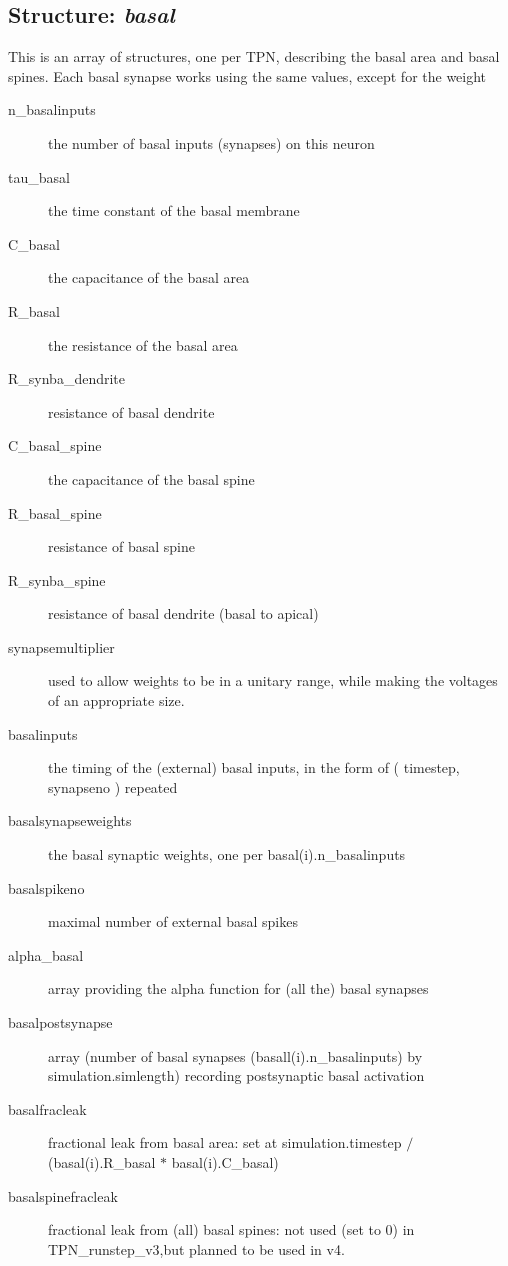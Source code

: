 \documentclass[11pt, oneside]{article}   	%
\begin{document}
\subsection{Structure: {\it basal}}
This is an array of structures, one per TPN, describing the basal area and basal spines. Each basal synapse works using the same values, except for the weight
\begin{description}
\item[n\_basalinputs] the number of basal inputs (synapses) on this neuron
\item[tau\_basal] the time constant of the basal membrane
\item[C\_basal] the capacitance of the basal area
\item[R\_basal] the resistance of the basal area
\item[R\_synba\_dendrite] resistance of basal dendrite
\item[C\_basal\_spine] the capacitance of the basal spine
\item[R\_basal\_spine] resistance of basal spine
\item[R\_synba\_spine] resistance of basal dendrite (basal to apical)
\item[synapsemultiplier] used to allow weights to be in a unitary range, while making the voltages of an appropriate size.
\item[basalinputs] the timing of the (external) basal inputs, in the form of ( timestep, synapseno ) repeated
\item[basalsynapseweights] the basal synaptic weights, one per basal(i).n\_basalinputs
\item[basalspikeno] maximal number of external basal spikes
\item[alpha\_basal] array providing the alpha function for (all the) basal synapses
\item[basalpostsynapse] array (number of basal synapses (basall(i).n\_basalinputs) by simulation.simlength) recording postsynaptic basal activation
\item[basalfracleak] fractional leak from basal area: set at simulation.timestep $/$ (basal(i).R\_basal $*$ basal(i).C\_basal)
\item[basalspinefracleak] fractional leak from (all) basal spines: not  used (set to 0) in TPN\_runstep\_v3,but planned to be used in v4.
\end{description}
\end{document}
